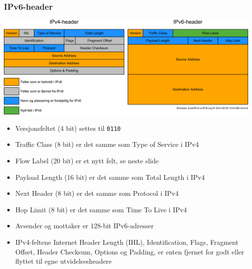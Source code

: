 \begin{frame}%
  \frametitle{IPv6-header}
  \begin{multicols}{2}
      {\includegraphics[scale=.1225]{IPv4-vs-IPv6.pdf}}

    \begin{itemize}[<+->]
    \item Versjonsfeltet (4 bit) settes til \texttt{0110}
    \item Traffic Class (8 bit) er det samme som Type of Service i
      IPv4
    \item Flow Label (20 bit) er et nytt felt, se neste slide
    \item Payload Length (16 bit) er det samme som Total Length i IPv4
    \item Next Header (8 bit) er det samme som Protocol i IPv4
    \item Hop Limit (8 bit) er det samme som Time To Live i IPv4
    \item Avsender og mottaker er 128-bit IPv6-adresser
    \item IPv4-feltene Internet Header Length (IHL), Identification,
      Flags, Fragment Offset, Header Checksum, Options og Padding, er
      enten fjernet for godt eller flyttet til egne utvidelsesheadere
    \end{itemize}
  \end{multicols}
\end{frame}


